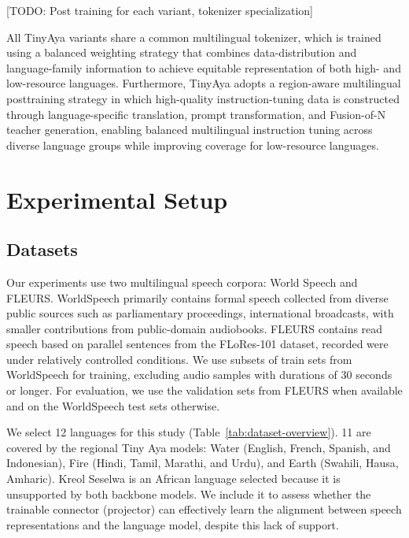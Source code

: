 \documentclass[11pt]{article}
\begin{document}
[TODO: Post training for each variant, tokenizer specialization]

All TinyAya variants share a common multilingual tokenizer, which is trained using a balanced weighting strategy that combines data-distribution and language-family information to achieve equitable representation of both high- and low-resource languages. Furthermore, TinyAya adopts a region-aware multilingual posttraining strategy in which high-quality instruction-tuning data is constructed through language-specific translation, prompt transformation, and Fusion-of-N teacher generation, enabling balanced multilingual instruction tuning across diverse language groups while improving coverage for low-resource languages.



\section{Experimental Setup}
\subsection{Datasets}
Our experiments use two multilingual speech corpora: World Speech \citep{asonitisWorldSpeechMultilingualSpeech2026} and FLEURS\citep{conneauFLEURSFEWShotLearning2023}. WorldSpeech primarily contains formal speech collected from diverse public sources such as parliamentary proceedings, international broadcasts, with smaller contributions from public-domain audiobooks. FLEURS contains read speech based on parallel sentences from the FLoRes-101 dataset, recorded were under relatively controlled conditions. We use subsets of train sets from WorldSpeech for training, excluding audio samples with durations of 30 seconds or longer. For evaluation, we use the validation sets from FLEURS when available and on the WorldSpeech test sets otherwise. 

We select 12 languages for this study (Table~\ref{tab:dataset-overview}). 11 are covered by the regional Tiny Aya models:  Water (English, French, Spanish, and Indonesian), Fire (Hindi, Tamil, Marathi, and Urdu), and Earth (Swahili, Hausa, Amharic). Kreol Seselwa is an African language selected because it is unsupported by both backbone models. We include it to assess whether the trainable connector (projector) can effectively learn the alignment between speech representations and the language model, despite this lack of support.
\end{document}
